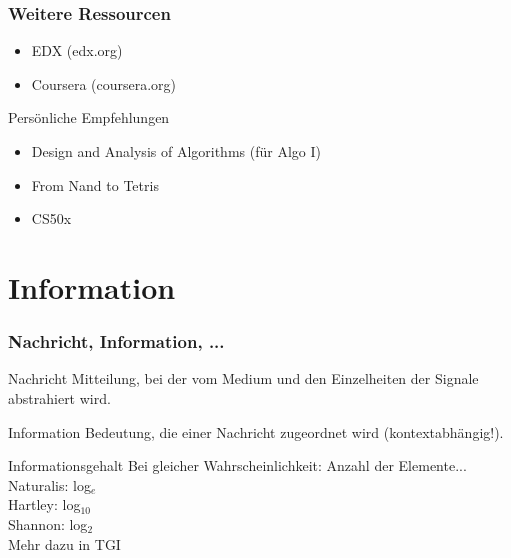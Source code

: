 \begin{frame}
	\frametitle{Weitere Ressourcen}
	
	\begin{itemize}
		\item EDX (edx.org)
		\item Coursera (coursera.org)
	\end{itemize}

	\begin{block}{Persönliche Empfehlungen}
		\begin{itemize}
			\item Design and Analysis of Algorithms (für Algo I)
			\item From Nand to Tetris
			\item CS50x
		\end{itemize}
	\end{block}
	
\end{frame}

%

\section{Information}
\begin{frame}
	\frametitle{Nachricht, Information, ...}
	
	\begin{block}{Nachricht}
		      Mitteilung, bei der vom Medium und den Einzelheiten der Signale abstrahiert wird.
	\end{block}
	
	\pause
	\begin{block}{Information}
		      Bedeutung, die einer Nachricht zugeordnet wird (kontextabhängig!).
	\end{block}
	
	\pause
	\begin{block}{Informationsgehalt}
		Bei gleicher Wahrscheinlichkeit: Anzahl der Elemente... \\
		      Naturalis: log$_{e}$ \\
		      Hartley: log$_{10}$ \\
		      Shannon: log$_{2}$ \\[1em]
		Mehr dazu in TGI
	\end{block}

\end{frame}






